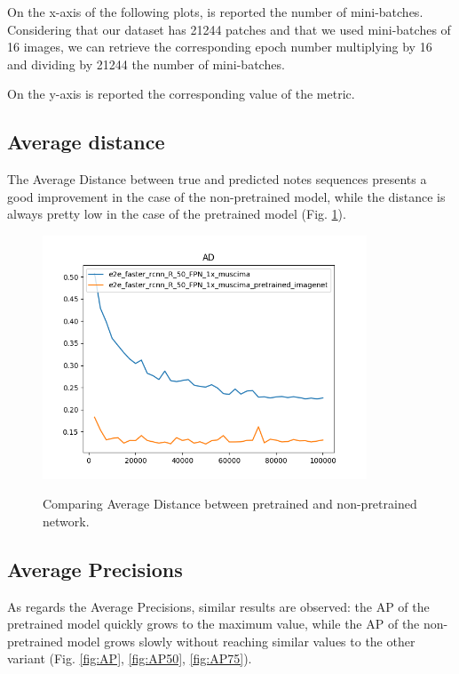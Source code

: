 \documentclass[journal]{IEEEtran}
\begin{document}
	On the x-axis of the following plots, is reported the number of mini-batches. Considering that our dataset has 21244 patches and that we used mini-batches of 16 images, we can retrieve the corresponding epoch number multiplying by 16 and dividing by 21244 the number of mini-batches.
	
	On the y-axis is reported the corresponding value of the metric.
	
	\subsection{Average distance}
	The Average Distance between true and predicted notes sequences presents a good improvement in the case of the non-pretrained model, while the distance is always pretty low in the case of the pretrained model (Fig. \ref{fig:AD}).
	
	\begin{figure} [h]
		\begin{center}
			\includegraphics[width=3.8in]{img/AD.png}\\
			\caption{Comparing Average Distance between pretrained and non-pretrained network.}
			\label{fig:AD}
		\end{center}
	\end{figure}

	\subsection{Average Precisions}
	As regards the Average Precisions, similar results are observed: the AP of the pretrained model quickly grows to the maximum value, while the AP of the non-pretrained model grows slowly without reaching similar values to the other variant (Fig. \ref{fig:AP}, \ref{fig:AP50}, \ref{fig:AP75}).
	
\end{document}
